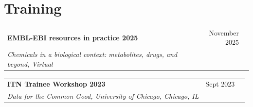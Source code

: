 \documentclass[a4paper,12pt]{article}
\begin{document}
\section{Training}
\begin{tabularx}{\linewidth}{ @{}l r@{} r@{} }
\textbf{EMBL-EBI resources in practice 2025} & \hfill \qquad \qquad \qquad November 2025 \\
\textit{Chemicals in a biological context: metabolites, drugs, and beyond, Virtual} & \\[3.75pt]


\end{tabularx}


\begin{tabularx}{\linewidth}{ @{}l r@{} r@{} }
\textbf{ITN Trainee Workshop 2023} & \hfill \qquad \qquad \qquad \qquad \qquad \qquad Sept 2023 \\
\textit{Data for the Common Good, University of Chicago, Chicago, IL} & \\[3.75pt]


\end{tabularx}
\end{document}
